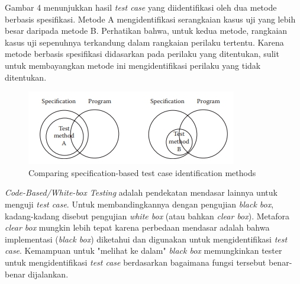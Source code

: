 \documentclass[a4paper,twoside]{article}
\begin{document}
\begin{enumerate}
Gambar 4 menunjukkan hasil \textit{test case} yang diidentifikasi oleh dua metode berbasis spesifikasi. Metode A mengidentifikasi serangkaian kasus uji yang lebih besar daripada metode B. Perhatikan bahwa, untuk kedua metode, rangkaian kasus uji sepenuhnya terkandung dalam rangkaian perilaku tertentu. Karena metode berbasis spesifikasi didasarkan pada perilaku yang ditentukan, sulit untuk membayangkan metode ini mengidentifikasi perilaku yang tidak ditentukan.
\begin{figure}
	\includegraphics[scale=1.2]{../DokumenSkripsi/gambar/compareAB}
	\centering
	\caption{Comparing specification-based test case identification methods}
\end{figure}
\textit{Code-Based/White-box Testing} adalah pendekatan mendasar lainnya untuk menguji \textit{test case}. Untuk membandingkannya dengan pengujian \textit{black box}, kadang-kadang disebut pengujian \textit{white box} (atau bahkan \textit{clear box}). Metafora \textit{clear box} mungkin lebih tepat karena perbedaan mendasar adalah bahwa implementasi (\textit{black box}) diketahui dan digunakan untuk mengidentifikasi \textit{test case}. Kemampuan untuk "melihat ke dalam" \textit{black box} memungkinkan tester untuk mengidentifikasi \textit{test case} berdasarkan bagaimana fungsi tersebut benar-benar dijalankan.


\end{enumerate}
\end{document}
